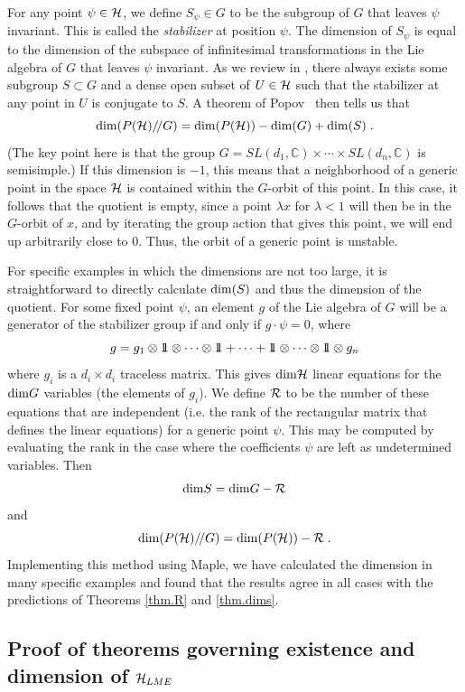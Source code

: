 \documentclass[12pt]{article}
\theoremstyle{definition}
\newcommand{\be}{\begin{equation}}
\newcommand{\ee}{\end{equation}}
\def\identity{{\rlap{1} \hskip 1.6pt \hbox{1}}}
\newcommand{\GITquot}{/\!/}
\begin{document}
For any point $\psi \in {\cal H}$, we define $S_\psi \in G$ to be the subgroup of $G$ that leaves $\psi$ invariant. This is called the {\it stabilizer} at position $\psi$. The dimension of $S_\psi$ is equal to the dimension of the subspace of infinitesimal transformations in the Lie algebra of $G$ that leaves $\psi$ invariant. As we review in \cite{mathpaper}, there always exists some subgroup $S \subset G$ and a dense open subset of $U \in {\cal H}$ such that the stabilizer at any point in $U$ is conjugate to $S$. A theorem of Popov~\cite{popov} then tells us that
\be
\label{realdim}
{\rm dim}(P({\cal H})\GITquot G) = {\rm dim}(P({\cal H})) - {\rm dim}(G) + {\rm dim}(S)    \; .
\ee
(The key point here is that the group $G = SL(d_1, \mathbb{C}) \times \cdots \times SL(d_n, \mathbb{C})$ is semisimple.)
If this dimension is $-1$, this means that a neighborhood of a generic point in the space ${\cal H}$ is contained within the $G$-orbit of this point. In this case, it follows that the quotient is empty, since a point $\lambda x$ for $\lambda < 1$ will then be in the $G$-orbit of $x$, and by iterating the group action that gives this point, we will end up arbitrarily close to 0. Thus, the orbit of a generic point is unstable.

For specific examples in which the dimensions are not too large, it is straightforward to directly calculate ${\rm dim}(S)$ and thus the dimension of the quotient.  For some fixed point $\psi$, an element $g$ of the Lie algebra of $G$ will be a generator of the stabilizer group if and only if $g \cdot \psi = 0$, where 
\be
g = g_1 \otimes \identity \otimes \cdots \otimes \identity + \dots + \identity \otimes \cdots \otimes \identity \otimes g_n
\ee 
where $g_i$ is a $d_i \times d_i$ traceless matrix. This gives ${\rm dim}{\cal H}$ linear equations for the ${\rm dim}G$ variables (the elements of $g_i$). We define ${\cal R}$ to be the number of these equations that are independent (i.e. the rank of the rectangular matrix that defines the linear equations) for a generic point $\psi$. This may be computed by evaluating the rank in the case where the coefficients $\psi$ are left as undetermined variables. Then
\be
{\rm dim} S = {\rm dim}G - {\cal R}
\ee
and 
\be
{\rm dim}(P({\cal H})\GITquot G) = {\rm dim}(P({\cal H})) - {\cal R} \; .
\ee
Implementing this method using Maple, we have calculated the dimension in many specific examples and found that the results agree in all cases with the predictions of Theorems \ref{thm.R} and \ref{thm.dims}. 

\subsection{Proof of theorems governing existence and dimension of ${\cal H}_{LME}$}
\end{document}
